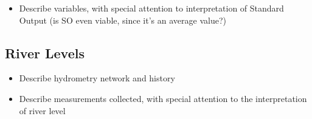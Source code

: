 \begin{itemize}
    \item Describe variables, with special attention to interpretation of Standard Output (is SO even viable, since it's an average value?)
\end{itemize}

\subsection{River Levels}
\begin{itemize}
    \item Describe hydrometry network and history
    \item Describe measurements collected, with special attention to the interpretation of river level
\end{itemize}

